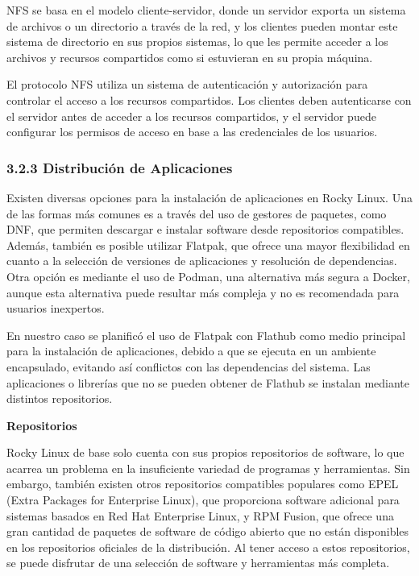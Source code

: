 \begin{spacing}{1.5}
    NFS se basa en el modelo cliente-servidor, donde un servidor exporta un sistema de archivos o un directorio a través de la red, y los clientes pueden montar este sistema de directorio en sus propios sistemas, lo que les permite acceder a los archivos y recursos compartidos como si estuvieran en su propia máquina.

    El protocolo NFS utiliza un sistema de autenticación y autorización para controlar el acceso a los recursos compartidos. Los clientes deben autenticarse con el servidor antes de acceder a los recursos compartidos, y el servidor puede configurar los permisos de acceso en base a las credenciales de los usuarios. \cite{RHEL-NFS-1} \cite{RHEL-NFS-2}

    \subsubsection{3.2.3 Distribución de Aplicaciones}
    Existen diversas opciones para la instalación de aplicaciones en Rocky Linux. Una de las formas más comunes es a través del uso de gestores de paquetes, como DNF, que permiten descargar e instalar software desde repositorios compatibles. Además, también es posible utilizar Flatpak, que ofrece una mayor flexibilidad en cuanto a la selección de versiones de aplicaciones y resolución de dependencias. Otra opción es mediante el uso de Podman, una alternativa más segura a Docker, aunque esta alternativa puede resultar más compleja y no es recomendada para usuarios inexpertos.

    En nuestro caso se planificó el uso de Flatpak con Flathub como medio principal para la instalación de aplicaciones, debido a que se ejecuta en un ambiente encapsulado, evitando así conflictos con las dependencias del sistema. Las aplicaciones o librerías que no se pueden obtener de Flathub se instalan mediante distintos repositorios.

    \textbf{Repositorios}
    
    Rocky Linux de base solo cuenta con sus propios repositorios de software, lo que acarrea un problema en la insuficiente variedad de programas y herramientas. Sin embargo, también existen otros repositorios compatibles populares como EPEL (Extra Packages for Enterprise Linux), que proporciona software adicional para sistemas basados en Red Hat Enterprise Linux, y RPM Fusion, que ofrece una gran cantidad de paquetes de software de código abierto que no están disponibles en los repositorios oficiales de la distribución. Al tener acceso a estos repositorios, se puede disfrutar de una selección de software y herramientas más completa. \cite{RL-repo-1} \cite{RHEL-EPEL-1} \cite{rpmfusion-1}


\end{spacing}
